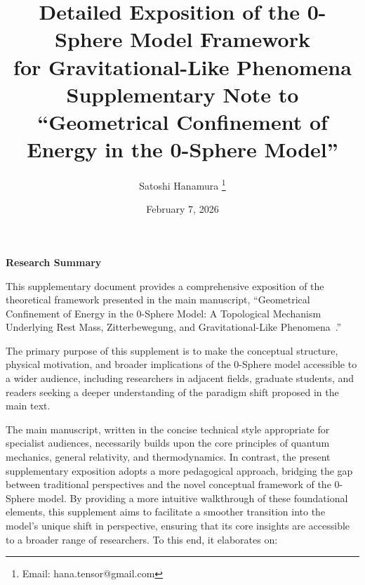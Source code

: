 \documentclass[12pt,letterpaper]{article}
\begin{document}
\title{Detailed Exposition of the 0-Sphere Model Framework\\
for Gravitational-Like Phenomena\\
\normalsize Supplementary Note to ``Geometrical Confinement of Energy in the 0-Sphere Model''}

\author{Satoshi Hanamura
\thanks{Email: hana.tensor@gmail.com}}

\date{February 7, 2026}

\maketitle

\tableofcontents

\begin{center}
\textbf{Research Summary}
\end{center}

\justifying

This supplementary document provides a comprehensive exposition of the theoretical framework presented in the main manuscript, ``Geometrical Confinement of Energy in the 0-Sphere Model: A Topological Mechanism Underlying Rest Mass, Zitterbewegung, and Gravitational-Like Phenomena~\cite{Hanamura2026geometrical}.''

The primary purpose of this supplement is to make the conceptual structure, physical motivation, and broader implications of the 0-Sphere model accessible to a wider audience, including researchers in adjacent fields, graduate students, and readers seeking a deeper understanding of the paradigm shift proposed in the main text.

The main manuscript, written in the concise technical style appropriate for specialist audiences, necessarily builds upon the core principles of quantum mechanics, general relativity, and thermodynamics. In contrast, the present supplementary exposition adopts a more pedagogical approach, bridging the gap between traditional perspectives and the novel conceptual framework of the 0-Sphere model. By providing a more intuitive walkthrough of these foundational elements, this supplement aims to facilitate a smoother transition into the model's unique shift in perspective, ensuring that its core insights are accessible to a broader range of researchers. To this end, it elaborates on:
\end{document}
